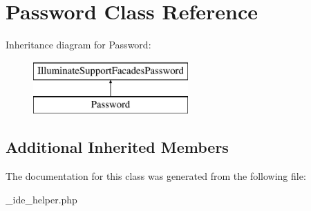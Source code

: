 \hypertarget{class_password}{}\section{Password Class Reference}
\label{class_password}
Inheritance diagram for Password\+:\begin{figure}[H]
\begin{center}
\leavevmode
\includegraphics[height=2.000000cm]{class_password}
\end{center}
\end{figure}
\subsection*{Additional Inherited Members}


The documentation for this class was generated from the following file\+:\begin{DoxyCompactItemize}
\item 
\+\_\+ide\+\_\+helper.\+php\end{DoxyCompactItemize}
